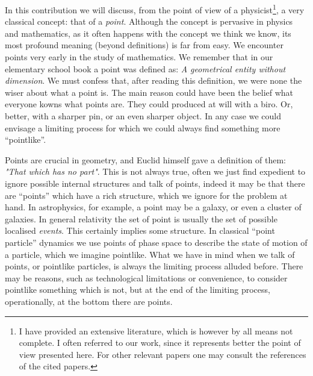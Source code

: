 \documentclass[12pt,a4paper]{article}
\begin{document}
In this contribution we will discuss, from the point of view of a physicist\footnote{I have provided an extensive literature, which is however by all means not complete. I often referred to our work, since it represents better the point of view presented here. For other relevant papers one may consult the references of the cited papers.}, a very classical concept: that of a \emph{point}. Although the concept is pervasive in physics and mathematics, as it often happens with the concept we think we know, its most profound meaning (beyond definitions) is far from easy. We encounter points very early in the study of mathematics. We remember that in our elementary school book a point was defined as: \emph{A geometrical entity without dimension}. We must confess that, after reading this definition, we were none the wiser about what a point is. The main reason could have been the belief what everyone kowns what  points are. They could produced at will with a biro. Or, better, with a sharper pin, or an even sharper object. In any case we could envisage a limiting process for which we could always find something more ``pointlike''.

Points are crucial in geometry, and Euclid himself gave a definition of them: \emph{"That which has no part"}. This is not always true, often we just find expedient to ignore possible internal structures and talk of points, indeed it may be that there are ``points'' which have a rich structure, which we ignore for the problem at hand. 
In astrophysics, for example, a point may be a galaxy, or even a cluster of galaxies. 
In general relativity the set of point is usually the set of possible localised \emph{events}. This certainly implies some structure. 
In classical ``point particle'' dynamics we use points of phase space to describe the state of motion of a particle, which we imagine pointlike. What we have in mind when we talk of points, or pointlike particles, is always the limiting process alluded before. There may be reasons, such as technological limitations or convenience, to consider pointlike something which is not, but at the end of the limiting process, operationally, at the bottom there are points.
\end{document}
